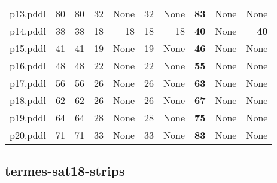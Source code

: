 \documentclass{article}
\begin{document}
\begin{tabular}{@{}lrrrrrrrrr@{}}
p13.pddl & 80 & 80 & 32 & \multicolumn{1}{|l|}{None} & 32 & \multicolumn{1}{|l|}{None} & \textbf{83} & \multicolumn{1}{|l|}{None} & \multicolumn{1}{|l|}{None} \\
p14.pddl & 38 & 38 & 18 & 18 & 18 & 18 & \textbf{40} & \multicolumn{1}{|l|}{None} & \textbf{40} \\
p15.pddl & 41 & 41 & 19 & \multicolumn{1}{|l|}{None} & 19 & \multicolumn{1}{|l|}{None} & \textbf{46} & \multicolumn{1}{|l|}{None} & \multicolumn{1}{|l|}{None} \\
p16.pddl & 48 & 48 & 22 & \multicolumn{1}{|l|}{None} & 22 & \multicolumn{1}{|l|}{None} & \textbf{55} & \multicolumn{1}{|l|}{None} & \multicolumn{1}{|l|}{None} \\
p17.pddl & 56 & 56 & 26 & \multicolumn{1}{|l|}{None} & 26 & \multicolumn{1}{|l|}{None} & \textbf{63} & \multicolumn{1}{|l|}{None} & \multicolumn{1}{|l|}{None} \\
p18.pddl & 62 & 62 & 26 & \multicolumn{1}{|l|}{None} & 26 & \multicolumn{1}{|l|}{None} & \textbf{67} & \multicolumn{1}{|l|}{None} & \multicolumn{1}{|l|}{None} \\
p19.pddl & 64 & 64 & 28 & \multicolumn{1}{|l|}{None} & 28 & \multicolumn{1}{|l|}{None} & \textbf{75} & \multicolumn{1}{|l|}{None} & \multicolumn{1}{|l|}{None} \\
p20.pddl & 71 & 71 & 33 & \multicolumn{1}{|l|}{None} & 33 & \multicolumn{1}{|l|}{None} & \textbf{83} & \multicolumn{1}{|l|}{None} & \multicolumn{1}{|l|}{None} \\
\end{tabular}

\hypertarget{initial_h_value-termes-sat18-strips}{}
\subsection*{termes-sat18-strips}
\end{document}

